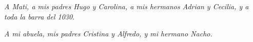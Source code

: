 \chapter*{}
\begin{flushright}
  \textit{A Mati, a mis padres Hugo y Carolina, a mis hermanos Adrian y Cecilia, y a toda la barra del 1030.}

  \textit{A mi abuela, mis padres Cristina y Alfredo, y mi hermano Nacho.}
\end{flushright}
\newpage

